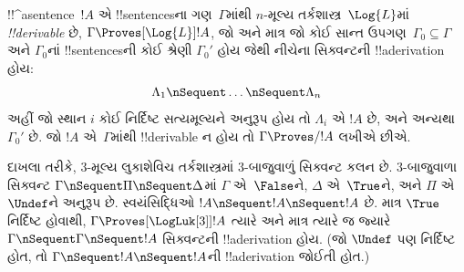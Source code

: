 \documentclass[../../../include/open-logic-section]{subfiles}
\begin{document}
\begin{defn}[!!^{derivability}]
!!^a{sentence}~$!A$ એ !!{sentence}sના ગણ~$\Gamma$માંથી
$n$-મૂલ્ય તર્કશાસ્ત્ર~$\Log{L}$માં \emph{!!{derivable}}
છે, $\Gamma \Proves[\Log{L}] !A$, જો અને માત્ર જો
કોઈ સાન્ત ઉપગણ~$\Gamma_0 \subseteq \Gamma$
અને $\Gamma_0$નાં !!{sentence}sની કોઈ શ્રેણી $\Gamma_0'$
હોય જેથી નીચેના સિક્વન્ટની !!a{derivation} હોય:
\[ \Lambda_1 \nSequent \dots \nSequent \Lambda_n \]
અહીં જો સ્થાન $i$ કોઈ નિર્દિષ્ટ સત્યમૂલ્યને અનુરૂપ હોય
તો $\Lambda_i$ એ $!A$ છે, અને અન્યથા $\Gamma_0'$ છે.
જો $!A$ એ~$\Gamma$માંથી !!{derivable} ન હોય તો
$\Gamma \Proves/ !A$ લખીએ છીએ.
\end{defn}

દાખલા તરીકે, $3$-મૂલ્ય લુકાશેવિચ તર્કશાસ્ત્રમાં
$3$-બાજુવાળું સિક્વન્ટ કલન છે. $3$-બાજુવાળા સિક્વન્ટ
$\Gamma \nSequent \Pi \nSequent \Delta$માં $\Gamma$
એ~$\False$ને, $\Delta$ એ~$\True$ને, અને $\Pi$
એ~$\Undef$ને અનુરૂપ છે. સ્વયંસિદ્ધિઓ
$!A \nSequent !A \nSequent !A$ છે. માત્ર $\True$
નિર્દિષ્ટ હોવાથી, $\Gamma \Proves[\LogLuk[3]] !A$
ત્યારે અને માત્ર ત્યારે જ જ્યારે
$\Gamma \nSequent \Gamma \nSequent !A$ સિક્વન્ટની
!!a{derivation} હોય. (જો $\Undef$ પણ નિર્દિષ્ટ હોત,
તો $\Gamma \nSequent !A \nSequent !A$ની
!!a{derivation} જોઈતી હોત.)
\end{document}
